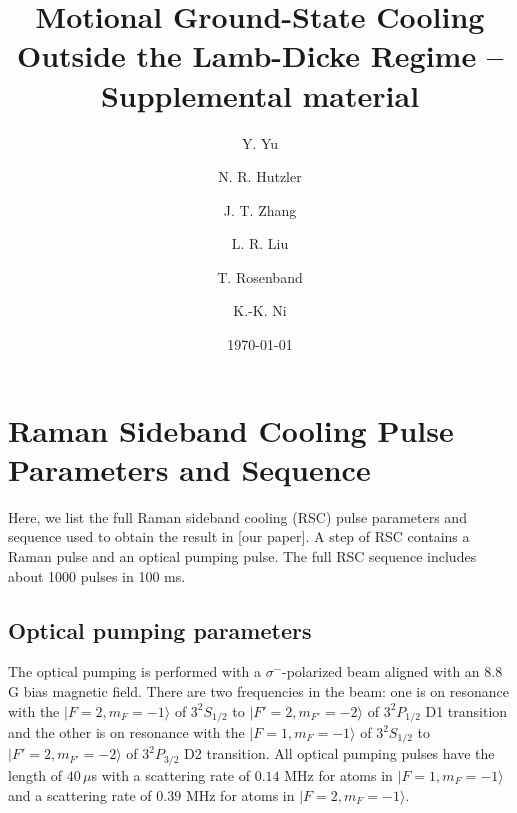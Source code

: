 \documentclass[aps,secnumarabic,amsmath,amssymb]{revtex4}
\begin{document}
\title{Motional Ground-State Cooling Outside the Lamb-Dicke Regime -- Supplemental material}
\author{Y. Yu}
\author{N. R. Hutzler}
\author{J. T. Zhang}
\author{L. R. Liu}
\author{T. Rosenband}
\author{K.-K. Ni}

\date{\today}

\maketitle

\section{Raman Sideband Cooling Pulse Parameters and Sequence}
Here, we list the full Raman sideband cooling (RSC) pulse  parameters and  sequence used to obtain the result in [our paper]. A step of RSC contains a Raman pulse and an optical pumping pulse. The full RSC sequence includes about 1000 pulses in 100 ms.

\subsection{Optical pumping parameters}
The optical pumping is performed with a $\sigma^-$-polarized beam aligned with an 8.8 G bias magnetic field.
There are two frequencies in the beam: one is on resonance with
the $|F=2,m_F=-1\rangle$ of $3^2S_{1/2}$ to $|F'=2,m_{F'}=-2\rangle$ of $3^2P_{1/2}$ D1 transition
and the other is on resonance with the $|F=1,m_F=-1\rangle$ of $3^2S_{1/2}$ to $|F'=2,m_{F'}=-2\rangle$ of $3^2P_{3/2}$ D2 transition.
All optical pumping pulses have the  length of $40\,\mu$s
with a  scattering rate of $0.14$ MHz for atoms in $|F=1,m_F=-1\rangle$
and a  scattering rate of $0.39$ MHz for atoms in $|F=2,m_F=-1\rangle$.
\end{document}
